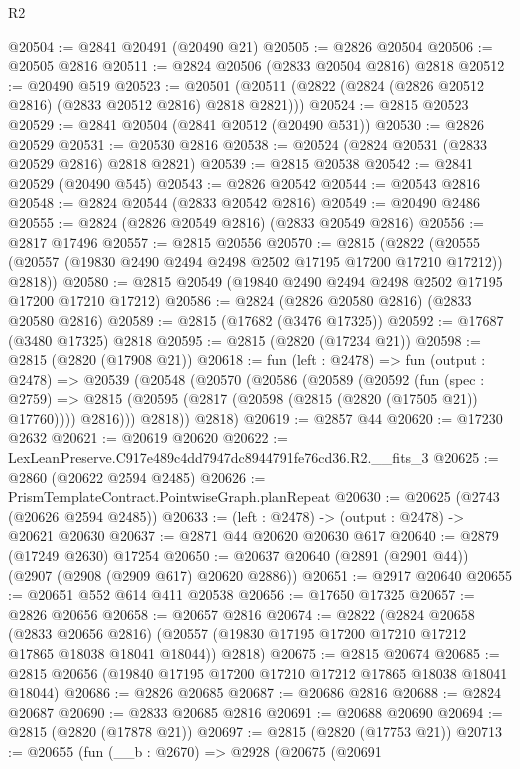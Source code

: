 \begin{lexlean}{R2}
\begin{coremodule}
@20504 := @2841 @20491 (@20490 @21)
@20505 := @2826 @20504
@20506 := @20505 @2816
@20511 := @2824 @20506 (@2833 @20504 @2816) @2818
@20512 := @20490 @519
@20523 := @20501 (@20511 (@2822 (@2824 (@2826 @20512 @2816) (@2833 @20512 @2816) @2818 @2821)))
@20524 := @2815 @20523
@20529 := @2841 @20504 (@2841 @20512 (@20490 @531))
@20530 := @2826 @20529
@20531 := @20530 @2816
@20538 := @20524 (@2824 @20531 (@2833 @20529 @2816) @2818 @2821)
@20539 := @2815 @20538
@20542 := @2841 @20529 (@20490 @545)
@20543 := @2826 @20542
@20544 := @20543 @2816
@20548 := @2824 @20544 (@2833 @20542 @2816)
@20549 := @20490 @2486
@20555 := @2824 (@2826 @20549 @2816) (@2833 @20549 @2816)
@20556 := @2817 @17496
@20557 := @2815 @20556
@20570 := @2815
    (@2822 (@20555 (@20557 (@19830 @2490 @2494 @2498 @2502 @17195 @17200 @17210 @17212)) @2818))
@20580 := @2815 @20549 (@19840 @2490 @2494 @2498 @2502 @17195 @17200 @17210 @17212)
@20586 := @2824 (@2826 @20580 @2816) (@2833 @20580 @2816)
@20589 := @2815 (@17682 (@3476 @17325))
@20592 := @17687 (@3480 @17325) @2818
@20595 := @2815 (@2820 (@17234 @21))
@20598 := @2815 (@2820 (@17908 @21))
@20618 := fun (left : @2478) =>
  fun (output : @2478) =>
  @20539
    (@20548
      (@20570
        (@20586
          (@20589
            (@20592
              (fun (spec : @2759) =>
              @2815 (@20595 (@2817 (@20598 (@2815 (@2820 (@17505 @21)) @17760)))) @2816)))
          @2818))
      @2818)
@20619 := @2857 @44
@20620 := @17230 @2632
@20621 := @20619 @20620
@20622 := LexLeanPreserve.C917e489c4dd7947dc8944791fe76cd36.R2.__fits_3
@20625 := @2860 (@20622 @2594 @2485)
@20626 := PrismTemplateContract.PointwiseGraph.planRepeat
@20630 := @20625 (@2743 (@20626 @2594 @2485))
@20633 := (left : @2478) -> (output : @2478) -> @20621 @20630
@20637 := @2871 @44 @20620 @20630 @617
@20640 := @2879 (@17249 @2630) @17254
@20650 := @20637 @20640 (@2891 (@2901 @44)) (@2907 (@2908 (@2909 @617) @20620 @2886))
@20651 := @2917 @20640
@20655 := @20651 @552 @614 @411 @20538
@20656 := @17650 @17325
@20657 := @2826 @20656
@20658 := @20657 @2816
@20674 := @2822
    (@2824
      @20658
      (@2833 @20656 @2816)
      (@20557 (@19830 @17195 @17200 @17210 @17212 @17865 @18038 @18041 @18044))
      @2818)
@20675 := @2815 @20674
@20685 := @2815 @20656 (@19840 @17195 @17200 @17210 @17212 @17865 @18038 @18041 @18044)
@20686 := @2826 @20685
@20687 := @20686 @2816
@20688 := @2824 @20687
@20690 := @2833 @20685 @2816
@20691 := @20688 @20690
@20694 := @2815 (@2820 (@17878 @21))
@20697 := @2815 (@2820 (@17753 @21))
@20713 := @20655
    (fun (__b : @2670) =>
    @2928
      (@20675
        (@20691

\end{coremodule}
\end{lexlean}
